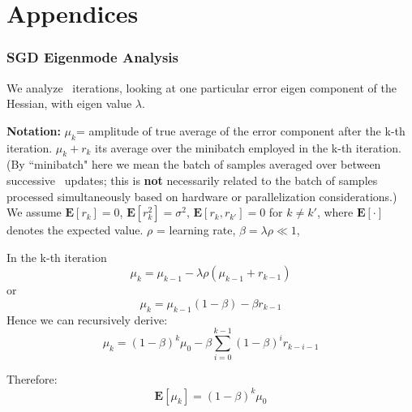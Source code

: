 \documentclass{article} %
\begin{document}

\newpage
\part{Appendices}

\appendix

\section{SGD Eigenmode Analysis}
\label{sec:sgd_eigenmode}
We analyze \SGD~iterations, looking at one particular error eigen component of the Hessian, with eigen value $\lambda$.

\textbf{Notation:} $\mu_k$= amplitude of true average of the error component after the k-th iteration. $\mu_k + r_k$ its average over the minibatch employed in the k-th iteration. (By ``minibatch" here we mean the batch of samples averaged over between successive \SGD~updates; this is \textbf{not} necessarily related to the batch of samples processed simultaneously based on hardware or parallelization considerations.) We assume $\mathbf{E}[r_k]=0$, $\mathbf{E}[r_k^2]=\sigma^2$, $\mathbf{E}[r_k,r_{k'}]=0$ for $k \neq k'$, where $\mathbf E[\cdot]$ denotes the expected value.
$\rho$ = learning rate, $\beta=\lambda \rho \ll 1$, 

In the k-th iteration 
\begin{equation}
\mu_k = \mu_{k-1} - \lambda \rho (\mu_{k-1} + r_{k-1})
\label{eqn:muupdate}
\end{equation}
or
\begin{equation}
	\mu_k = \mu_{k-1} (1- \beta)  - \beta r_{k-1}
	\label{eqn:muupdate2}
\end{equation}
Hence we can recursively derive:
\begin{equation}
  \mu_k = (1-\beta)^k \mu_0 - \beta \sum_{i=0}^{k-1} (1-\beta)^i r_{k-i-1}
\end{equation}

Therefore:
\begin{equation}
\mathbf E [\mu_k] = (1-\beta)^k \mu_0 
\end{equation}
\end{document}
